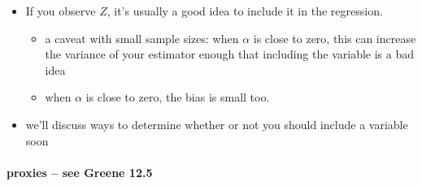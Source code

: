 \begin{itemize}
\item If you observe $Z$, it's usually a good idea to include it
          in the regression.
\begin{itemize}
\item a caveat with small sample sizes: when $\alpha$ is close
            to zero, this can increase the variance of your estimator
            enough that including the variable is a bad idea
\item when $\alpha$ is close to zero, the bias is small too.
\end{itemize}
\item we'll discuss ways to determine whether or not you should
          include a variable soon
\end{itemize}
\paragraph{proxies -- see Greene 12.5}
\label{sec-2-1-1-2-2}

